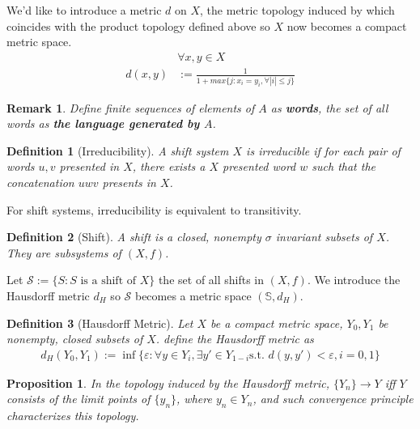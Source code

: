 \documentclass{article}
\newtheorem{definition}{Definition}
\newtheorem{proposition}{Proposition}
\newtheorem{remark}{Remark}
\begin{document}
\begin{CJK}{UTF8}{gbsn}
We'd like to introduce a metric $d$ on $X$, the metric topology induced by which coincides with the product topology defined above so $X$ now becomes a compact metric space.
\begin{align*}
	&\forall x,y\in X \\
	d(x,y)&:=\frac{1}{1+max\{j:x_i=y_i,\forall |i|\leq j\}}
\end{align*}

\begin{remark}
	Define finite sequences of elements of $A$ as \textbf{words}, the set of all words as \textbf{the language generated by $A$}.
\end{remark}


\begin{definition}[Irreducibility]
	A shift system $X$ is irreducible if for each pair of words $u,v$ presented in $X$, there exists a $X$ presented word $w$ such that the concatenation $uwv$ presents in $X$.
\end{definition}

For shift systems, irreducibility is equivalent to transitivity.


\begin{definition}[Shift]
	A shift is a closed, nonempty $\sigma$ invariant subsets of $X$. They are subsystems of $(X,f)$.
\end{definition}

Let $\mathcal{S}:=\{S:S\mbox{ is a shift of }X\}$ the set of all shifts in $(X,f)$. We introduce the Hausdorff metric $d_H$ so $\mathcal{S}$ becomes a metric space $(\mathbb{S},d_H)$.



\begin{definition}[Hausdorff Metric]
	Let $X$ be a compact metric space, $Y_0,Y_1$ be nonempty, closed subsets of $X$. define the Hausdorff metric as
	\begin{align*}
		d_H(Y_0,Y_1):=\inf\{\varepsilon:\forall y\in Y_i, \exists y'\in Y_{1-i} \mbox{s.t. }d(y,y')<\varepsilon ,i=0,1\}
	\end{align*}
\end{definition}



\begin{proposition}
	In the topology induced by the Hausdorff metric, $\{Y_n\}\rightarrow Y$ iff $Y$ consists of the limit points of $\{y_n\}$, where $y_n\in Y_n$, and such convergence principle characterizes this topology.
\end{proposition}


\end{CJK}
\end{document}
